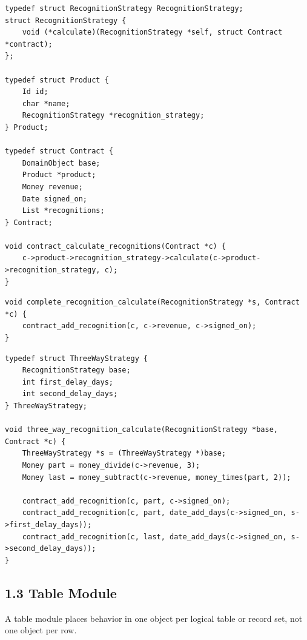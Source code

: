 \documentclass[11pt]{article}
\begin{document}
\begin{verbatim}
typedef struct RecognitionStrategy RecognitionStrategy;
struct RecognitionStrategy {
    void (*calculate)(RecognitionStrategy *self, struct Contract *contract);
};

typedef struct Product {
    Id id;
    char *name;
    RecognitionStrategy *recognition_strategy;
} Product;

typedef struct Contract {
    DomainObject base;
    Product *product;
    Money revenue;
    Date signed_on;
    List *recognitions;
} Contract;

void contract_calculate_recognitions(Contract *c) {
    c->product->recognition_strategy->calculate(c->product->recognition_strategy, c);
}
\end{verbatim}

\begin{verbatim}
void complete_recognition_calculate(RecognitionStrategy *s, Contract *c) {
    contract_add_recognition(c, c->revenue, c->signed_on);
}
\end{verbatim}

\begin{verbatim}
typedef struct ThreeWayStrategy {
    RecognitionStrategy base;
    int first_delay_days;
    int second_delay_days;
} ThreeWayStrategy;

void three_way_recognition_calculate(RecognitionStrategy *base, Contract *c) {
    ThreeWayStrategy *s = (ThreeWayStrategy *)base;
    Money part = money_divide(c->revenue, 3);
    Money last = money_subtract(c->revenue, money_times(part, 2));

    contract_add_recognition(c, part, c->signed_on);
    contract_add_recognition(c, part, date_add_days(c->signed_on, s->first_delay_days));
    contract_add_recognition(c, last, date_add_days(c->signed_on, s->second_delay_days));
}
\end{verbatim}

\subsection{1.3 Table Module}\label{table-module}

A table module places behavior in one object per logical table or record
set, not one object per row.
\end{document}
